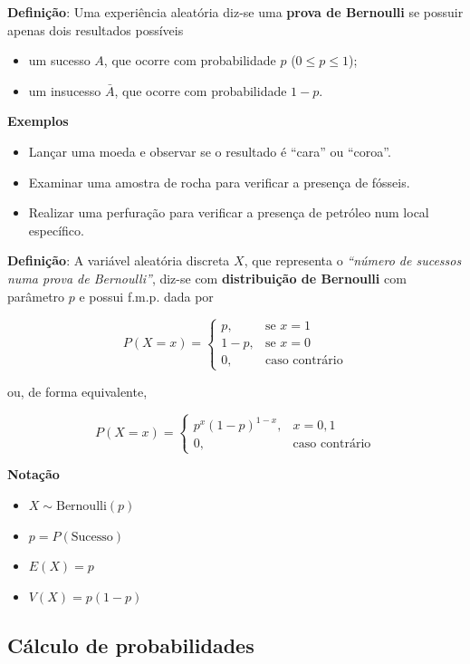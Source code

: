 \documentclass[
]{book}
\providecommand{\tightlist}{%
  \setlength{\itemsep}{0pt}\setlength{\parskip}{0pt}}
\begin{document}
\textbf{Definição}: Uma experiência aleatória diz-se uma \textbf{prova de Bernoulli} se possuir apenas dois resultados possíveis

\begin{itemize}
\item
  um sucesso \(A\), que ocorre com probabilidade \(p\) (\(0\leq p \leq 1\));
\item
  um insucesso \(\bar{A}\), que ocorre com probabilidade \(1-p\).
\end{itemize}

\textbf{Exemplos}

\begin{itemize}
\tightlist
\item
  Lançar uma moeda e observar se o resultado é ``cara'' ou ``coroa''.
\item
  Examinar uma amostra de rocha para verificar a presença de fósseis.
\item
  Realizar uma perfuração para verificar a presença de petróleo num local específico.
\end{itemize}

\textbf{Definição}: A variável aleatória discreta \(X\), que representa o \emph{``número de sucessos numa prova de Bernoulli''}, diz-se com \textbf{distribuição de Bernoulli} com parâmetro \(p\) e possui f.m.p. dada por

\[
P(X = x) = 
\begin{cases} 
p, & \text{se } x = 1 \\ 
1 - p, & \text{se } x = 0 \\ 
0, & \text{caso contrário}
\end{cases}
\]

ou, de forma equivalente,

\[
P(X = x) = \begin{cases} p^x (1 - p)^{1 - x}, & x = 0, 1 \\ 0, & \text{caso contrário} \end{cases}
\]

\textbf{Notação}

\begin{itemize}
\tightlist
\item
  \(X \sim \text{Bernoulli}(p)\)
\item
  \(p = P(\text{Sucesso})\)
\item
  \(E(X) = p\)
\item
  \(V(X) = p(1 - p)\)
\end{itemize}

\subsection{Cálculo de probabilidades}\label{cuxe1lculo-de-probabilidades}
\end{document}
